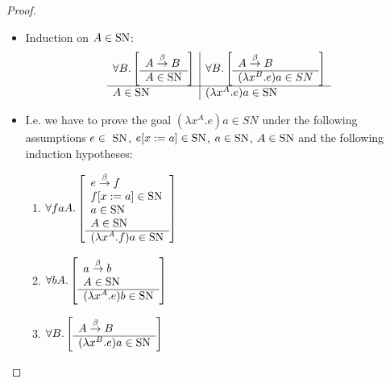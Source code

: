 \begin{theorem}
\begin{proof}
\begin{itemize}
        \item Induction on $A \in \text{SN}$:
            $$
            \begin{array}{l|l}
                \forall B. \left[ \begin{array}{l} A \stackrel{\beta}{\to} B \\ \hline A \in \text{SN}\end{array} \right]
                &
                \forall B. \left[ \begin{array}{l} 
                    A \stackrel{\beta}{\to} B
                 \\ \hline (\lambda x^B. e)a \in SN\end{array} \right]
                \\
                \hline
                A \in \text{SN}
                &
                (\lambda x^A.e) a \in \text{SN}
            \end{array}
            $$

        \item I.e. we have to prove the goal $(\lambda x^A.e)a \in SN$ under the
            following assumptions $e \in \SN$, $e[x:=a] \in \text{SN}$, $a \in \text{SN}$,
            $A \in \text{SN}$ and the following induction hypotheses:
            \begin{enumerate}

            \item $\forall faA. \left[ \begin{array}{l} 
                    e \stackrel{\beta}{\to} f
                    \\
                    f[x:=a] \in \text{SN}
                    \\
                    a \in \text{SN}
                    \\
                    A \in \text{SN}
                 \\ \hline (\lambda x^A.f)a \in \text{SN}\end{array} \right]$

            \item $\forall bA. \left[ \begin{array}{l} 
                    a \stackrel{\beta}{\to} b
                    \\
                    A \in \text{SN}
                 \\ \hline (\lambda x^A.e)b \in \text{SN}\end{array} \right]$

            \item $\forall B. \left[ \begin{array}{l} 
                    A \stackrel{\beta}{\to} B
                 \\ \hline (\lambda x^B.e)a \in \text{SN}\end{array} \right]$
            \end{enumerate}
        \end{itemize}


\end{proof}
\end{theorem}
